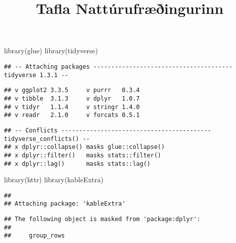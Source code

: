 \documentclass[
]{article}
\title{Tafla Nattúrufræðingurinn}
\author{}
\date{\vspace{-2.5em}}
\newenvironment{Shaded}{\begin{snugshade}}{\end{snugshade}}
\newcommand{\FunctionTok}[1]{\textcolor[rgb]{0.00,0.00,0.00}{#1}}
\newcommand{\NormalTok}[1]{#1}
\begin{document}
\maketitle

\begin{Shaded}
\begin{Highlighting}[]
\FunctionTok{library}\NormalTok{(glue)  }
\FunctionTok{library}\NormalTok{(tidyverse)  }
\end{Highlighting}
\end{Shaded}

\begin{verbatim}
## -- Attaching packages --------------------------------------- tidyverse 1.3.1 --
\end{verbatim}

\begin{verbatim}
## v ggplot2 3.3.5     v purrr   0.3.4
## v tibble  3.1.3     v dplyr   1.0.7
## v tidyr   1.1.4     v stringr 1.4.0
## v readr   2.1.0     v forcats 0.5.1
\end{verbatim}

\begin{verbatim}
## -- Conflicts ------------------------------------------ tidyverse_conflicts() --
## x dplyr::collapse() masks glue::collapse()
## x dplyr::filter()   masks stats::filter()
## x dplyr::lag()      masks stats::lag()
\end{verbatim}

\begin{Shaded}
\begin{Highlighting}[]
\FunctionTok{library}\NormalTok{(httr)}
\FunctionTok{library}\NormalTok{(kableExtra)}
\end{Highlighting}
\end{Shaded}

\begin{verbatim}
## 
## Attaching package: 'kableExtra'
\end{verbatim}

\begin{verbatim}
## The following object is masked from 'package:dplyr':
## 
##     group_rows
\end{verbatim}
\end{document}
